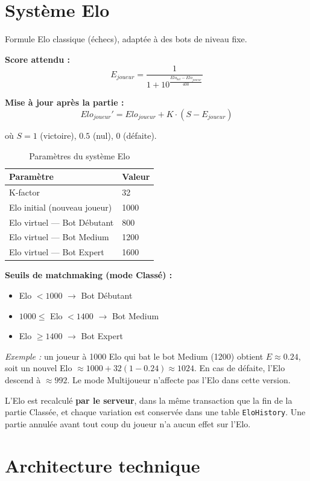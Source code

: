 \documentclass[a4paper,11pt]{article}
\begin{document}
\section{Système Elo}
\label{sec:elo}

Formule Elo classique (échecs), adaptée à des bots de niveau fixe.

\textbf{Score attendu :}
\[
E_{joueur} = \frac{1}{1 + 10^{\frac{Elo_{bot} - Elo_{joueur}}{400}}}
\]

\textbf{Mise à jour après la partie :}
\[
Elo_{joueur}' = Elo_{joueur} + K \cdot (S - E_{joueur})
\]

où $S = 1$ (victoire), $0.5$ (nul), $0$ (défaite).

\begin{table}[H]
\centering
\begin{tabular}{@{}ll@{}}
\toprule
Paramètre & Valeur \\
\midrule
K-factor & 32 \\
Elo initial (nouveau joueur) & 1000 \\
Elo virtuel --- Bot Débutant & 800 \\
Elo virtuel --- Bot Medium & 1200 \\
Elo virtuel --- Bot Expert & 1600 \\
\bottomrule
\end{tabular}
\caption{Paramètres du système Elo}
\end{table}

\textbf{Seuils de matchmaking (mode Classé) :}
\begin{itemize}[leftmargin=1.5em]
  \item Elo $< 1000$ $\rightarrow$ Bot Débutant
  \item $1000 \le$ Elo $< 1400$ $\rightarrow$ Bot Medium
  \item Elo $\ge 1400$ $\rightarrow$ Bot Expert
\end{itemize}

\textit{Exemple :} un joueur à 1000 Elo qui bat le bot Medium (1200) obtient
$E \approx 0.24$, soit un nouvel Elo $\approx 1000 + 32(1-0.24) \approx 1024$. En cas
de défaite, l'Elo descend à $\approx 992$. Le mode Multijoueur n'affecte pas l'Elo
dans cette version.

L'Elo est recalculé \textbf{par le serveur}, dans la même transaction que la fin de
la partie Classée, et chaque variation est conservée dans une table
\texttt{EloHistory}. Une partie annulée avant tout coup du joueur n'a aucun effet sur
l'Elo.

\section{Architecture technique}
\label{sec:archi}
\end{document}
